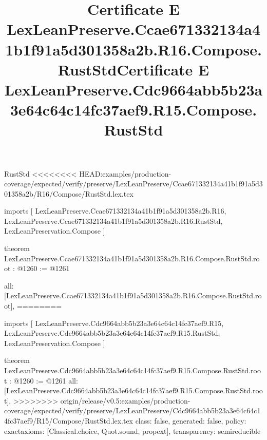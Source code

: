 \begin{lexlean}{RustStd}
<<<<<<<< HEAD:examples/production-coverage/expected/verify/preserve/LexLeanPreserve/Ccae671332134a41b1f91a5d301358a2b/R16/Compose/RustStd.lex.tex
\title{Certificate E LexLeanPreserve.Ccae671332134a41b1f91a5d301358a2b.R16.Compose.RustStd}
\begin{coremodule}
imports [
  LexLeanPreserve.Ccae671332134a41b1f91a5d301358a2b.R16,
  LexLeanPreserve.Ccae671332134a41b1f91a5d301358a2b.R16.RustStd,
  LexLeanPreservation.Compose
]

theorem LexLeanPreserve.Ccae671332134a41b1f91a5d301358a2b.R16.Compose.RustStd.root : @1260 := @1261 {
  all: [LexLeanPreserve.Ccae671332134a41b1f91a5d301358a2b.R16.Compose.RustStd.root],
========
\title{Certificate E LexLeanPreserve.Cdc9664abb5b23a3e64c64c14fc37aef9.R15.Compose.RustStd}
\begin{coremodule}
imports [
  LexLeanPreserve.Cdc9664abb5b23a3e64c64c14fc37aef9.R15,
  LexLeanPreserve.Cdc9664abb5b23a3e64c64c14fc37aef9.R15.RustStd,
  LexLeanPreservation.Compose
]

theorem LexLeanPreserve.Cdc9664abb5b23a3e64c64c14fc37aef9.R15.Compose.RustStd.root : @1260 := @1261 {
  all: [LexLeanPreserve.Cdc9664abb5b23a3e64c64c14fc37aef9.R15.Compose.RustStd.root],
>>>>>>>> origin/release/v0.5:examples/production-coverage/expected/verify/preserve/LexLeanPreserve/Cdc9664abb5b23a3e64c64c14fc37aef9/R15/Compose/RustStd.lex.tex
  class: false,
  generated: false,
  policy: exact{axioms: [Classical.choice, Quot.sound, propext]},
  transparency: semireducible
}


\end{coremodule}}
\end{coremodule}
\end{lexlean}
